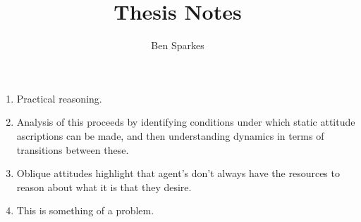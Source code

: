 \documentclass[10pt]{article}
\title{Thesis Notes}
\author{Ben Sparkes}
\begin{document}
\maketitle

\begin{enumerate}
\item Practical reasoning.
\item Analysis of this proceeds by identifying conditions under which static attitude ascriptions can be made, and then understanding dynamics in terms of transitions between these.
\item Oblique attitudes highlight that agent's don't always have the resources to reason about what it is that they desire.
\item This is something of a problem.
\end{enumerate}
\end{document}

